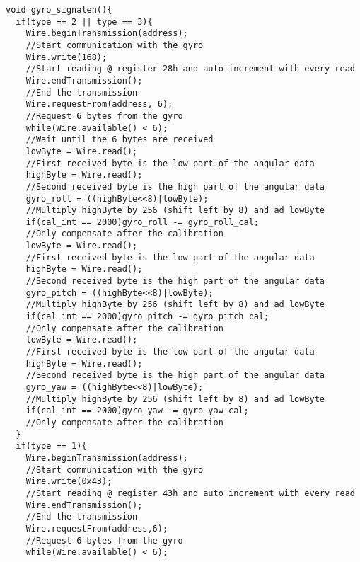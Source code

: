 \begin{lstlisting}
void gyro_signalen(){
  if(type == 2 || type == 3){
    Wire.beginTransmission(address);                             
    //Start communication with the gyro
    Wire.write(168);                                             
    //Start reading @ register 28h and auto increment with every read
    Wire.endTransmission();                                      
    //End the transmission
    Wire.requestFrom(address, 6);                                
    //Request 6 bytes from the gyro
    while(Wire.available() < 6);                                 
    //Wait until the 6 bytes are received
    lowByte = Wire.read();                                       
    //First received byte is the low part of the angular data
    highByte = Wire.read();                                      
    //Second received byte is the high part of the angular data
    gyro_roll = ((highByte<<8)|lowByte);                         
    //Multiply highByte by 256 (shift left by 8) and ad lowByte
    if(cal_int == 2000)gyro_roll -= gyro_roll_cal;               
    //Only compensate after the calibration
    lowByte = Wire.read();                                       
    //First received byte is the low part of the angular data
    highByte = Wire.read();                                      
    //Second received byte is the high part of the angular data
    gyro_pitch = ((highByte<<8)|lowByte);                        
    //Multiply highByte by 256 (shift left by 8) and ad lowByte
    if(cal_int == 2000)gyro_pitch -= gyro_pitch_cal;             
    //Only compensate after the calibration
    lowByte = Wire.read();                                       
    //First received byte is the low part of the angular data
    highByte = Wire.read();                                      
    //Second received byte is the high part of the angular data
    gyro_yaw = ((highByte<<8)|lowByte);                          
    //Multiply highByte by 256 (shift left by 8) and ad lowByte
    if(cal_int == 2000)gyro_yaw -= gyro_yaw_cal;                 
    //Only compensate after the calibration
  }
  if(type == 1){
    Wire.beginTransmission(address);                             
    //Start communication with the gyro
    Wire.write(0x43);                                            
    //Start reading @ register 43h and auto increment with every read
    Wire.endTransmission();                                      
    //End the transmission
    Wire.requestFrom(address,6);                                 
    //Request 6 bytes from the gyro
    while(Wire.available() < 6);                                 

\end{lstlisting}
